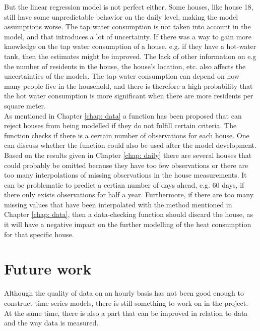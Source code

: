 \noindent But the linear regression model is not perfect either. Some houses, like house 18, still have some unpredictable behavior on the daily level, making the model assumptions worse. The tap water consumption is not taken into account in the model, and that introduces a lot of uncertainty. If there was a way to gain more knowledge on the tap water consumption of a house, e.g. if they have a hot-water tank, then the estimates might be improved. The lack of other information on e.g the number of residents in the house, the house's location, etc. also affects the uncertainties of the models. The tap water consumption can depend on how many people live in the household, and there is therefore a high probability that the hot water consumption is more significant when there are more residents per square meter.\\

\noindent As mentioned in Chapter \ref{chap: data} a function has been proposed that can reject houses from being modelled if they do not fulfill certain criteria. The function checks if there is a certain number of observations for each house. One can discuss whether the function could also be used after the model development. Based on the results given in Chapter \ref{chap: daily} there are several houses that could probably be omitted because they have too few observations or there are too many interpolations of missing observations in the house measurements. It can be problematic to predict a certian number of days ahead, e.g. 60 days, if there only exists observations for half a year. Furthermore, if there are too many missing values ​​that have been interpolated with the method mentioned in Chapter \ref{chap: data}, then a data-checking function should discard the house, as it will have a negative impact on the further modelling of the heat consumption for that specific house. \\





\section{Future work}
Although the quality of data on an hourly basis has not been good enough to construct time series models, there is still something to work on in the project. At the same time, there is also a part that can be improved in relation to data and the way data is measured. \\

